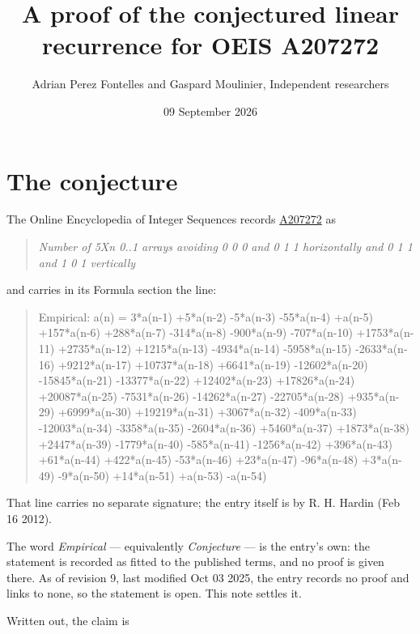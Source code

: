\documentclass[11pt]{article}
\title{A proof of the conjectured linear recurrence for OEIS A207272}
\author{Adrian Perez Fontelles and Gaspard Moulinier, Independent researchers}
\date{09 September 2026}
\theoremstyle{definition}
\begin{document}
\maketitle
\section{The conjecture}

The Online Encyclopedia of Integer Sequences records \href{https://oeis.org/A207272}{A207272} as

\begin{quote}\itshape Number of 5Xn 0..1 arrays avoiding 0 0 0 and 0 1 1 horizontally and 0 1 1 and 1 0 1 vertically\end{quote}

and carries in its Formula section the line:

\begin{quote}\ttfamily Empirical: a(n) = 3*a(n-1) +5*a(n-2) -5*a(n-3) -55*a(n-4) +a(n-5) +157*a(n-6) +288*a(n-7) -314*a(n-8) -900*a(n-9) -707*a(n-10) +1753*a(n-11) +2735*a(n-12) +1215*a(n-13) -4934*a(n-14) -5958*a(n-15) -2633*a(n-16) +9212*a(n-17) +10737*a(n-18) +6641*a(n-19) -12602*a(n-20) -15845*a(n-21) -13377*a(n-22) +12402*a(n-23) +17826*a(n-24) +20087*a(n-25) -7531*a(n-26) -14262*a(n-27) -22705*a(n-28) +935*a(n-29) +6999*a(n-30) +19219*a(n-31) +3067*a(n-32) -409*a(n-33) -12003*a(n-34) -3358*a(n-35) -2604*a(n-36) +5460*a(n-37) +1873*a(n-38) +2447*a(n-39) -1779*a(n-40) -585*a(n-41) -1256*a(n-42) +396*a(n-43) +61*a(n-44) +422*a(n-45) -53*a(n-46) +23*a(n-47) -96*a(n-48) +3*a(n-49) -9*a(n-50) +14*a(n-51) +a(n-53) -a(n-54)\end{quote}

That line carries no separate signature; the entry itself is by R. H. Hardin (Feb 16 2012).

The word {\itshape Empirical} --- equivalently {\itshape Conjecture} --- is the entry's own: the statement is recorded as fitted to the published terms, and no proof is given there. As of revision 9, last modified Oct 03 2025, the entry records no proof and links to none, so the statement is open. This note settles it.

Written out, the claim is
\end{document}
